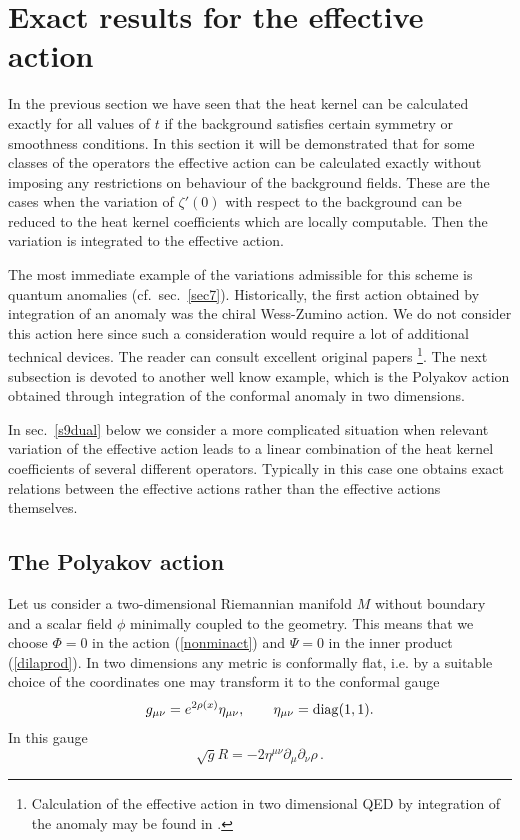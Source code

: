 \section{Exact results for the effective action}\label{sec9}
In the previous section we have seen that the heat kernel can be
calculated exactly for all values of $t$ if the background satisfies certain
symmetry or smoothness conditions. In this section it will be
demonstrated that for some classes of the operators the effective
action can be calculated exactly without imposing any restrictions
on behaviour of the background fields. These are the cases when the
variation of $\zeta'(0)$ with respect to the background
can be reduced to the heat kernel coefficients which are locally
computable. Then the variation is integrated to the effective action.

The most immediate example of the variations admissible for this scheme
is quantum anomalies (cf.\ sec.\ \ref{sec7}). Historically, the first
action obtained by integration of an anomaly was the chiral Wess-Zumino
action. We do not consider this action here since such a consideration
would require a lot of additional technical devices. The reader can
consult excellent original papers 
\cite{Wess:1971yu,Witten:1983tw}\footnote{Calculation of the effective
action in two dimensional QED by integration of the anomaly may
be found in \cite{Hortacsu:1979fg}.}. 
The next subsection is devoted to another well know example,
which is the Polyakov action obtained through integration of the
conformal anomaly in two dimensions.

In sec.\ \ref{s9dual} below we consider a more complicated situation when
relevant variation of the effective action leads to a linear combination
of the heat kernel coefficients of several different operators. Typically
in this case one obtains exact relations between the effective actions
rather than the effective actions themselves.
\subsection{The Polyakov action}\label{s9polyakov}
Let us consider a two-dimensional Riemannian manifold $M$
without boundary and
a scalar field $\phi$ minimally coupled to the geometry.
This means that we choose $\Phi =0$ in the action
(\ref{nonminact}) and $\Psi =0$ in the inner product
(\ref{dilaprod}). In two dimensions any metric is conformally
flat, i.e. by a suitable choice of the coordinates one may
transform it to the conformal gauge
\begin{equation}
g_{\mu\nu}=e^{2\rho (x)} \eta_{\mu\nu},\qquad
\eta_{\mu\nu}={\rm diag} (1,1).\label{cgauge}
\end{equation} 
In this gauge
\begin{equation}
\sqrt{g}R=-2\eta^{\mu\nu} \partial_\mu\partial_\nu \rho
\,.\label{confR}
\end{equation}

